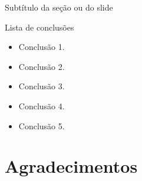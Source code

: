 \documentclass[%
  10pt,%
  aspectratio = 169,%
  compress,%
  t,%
]{beamer}%
\begin{document}
\begin{frame}{}{Subtítulo da seção ou do slide}
\begin{block}{Lista de conclusões}
\begin{itemize}
\item Conclusão 1.
\item Conclusão 2.
\item Conclusão 3.
\item Conclusão 4.
\item Conclusão 5.
\end{itemize}
\end{block}
\end{frame}



\section*{Agradecimentos}\label{sec:agrad}
\end{document}
